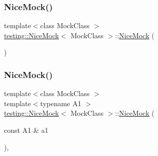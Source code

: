 \subsubsection{\texorpdfstring{NiceMock()}{NiceMock()}\hspace{0.1cm}{\footnotesize\ttfamily [1/11]}}
{\footnotesize\ttfamily template$<$class Mock\+Class $>$ \\
\mbox{\hyperlink{classtesting_1_1NiceMock}{testing\+::\+Nice\+Mock}}$<$ Mock\+Class $>$\+::\mbox{\hyperlink{classtesting_1_1NiceMock}{Nice\+Mock}} (\begin{DoxyParamCaption}{ }\end{DoxyParamCaption})\hspace{0.3cm}{\ttfamily [inline]}}

\mbox{\label{classtesting_1_1NiceMock_a2d6b9cb9d929d1af4532b69c7ef19df6}} 
\subsubsection{\texorpdfstring{NiceMock()}{NiceMock()}\hspace{0.1cm}{\footnotesize\ttfamily [2/11]}}
{\footnotesize\ttfamily template$<$class Mock\+Class $>$ \\
template$<$typename A1 $>$ \\
\mbox{\hyperlink{classtesting_1_1NiceMock}{testing\+::\+Nice\+Mock}}$<$ Mock\+Class $>$\+::\mbox{\hyperlink{classtesting_1_1NiceMock}{Nice\+Mock}} (\begin{DoxyParamCaption}\item[{const A1 \&}]{a1 }\end{DoxyParamCaption})\hspace{0.3cm}{\ttfamily [inline]}, {\ttfamily [explicit]}}

\mbox{\label{classtesting_1_1NiceMock_a150837476e88f52772c8f85180b889a1}} 
